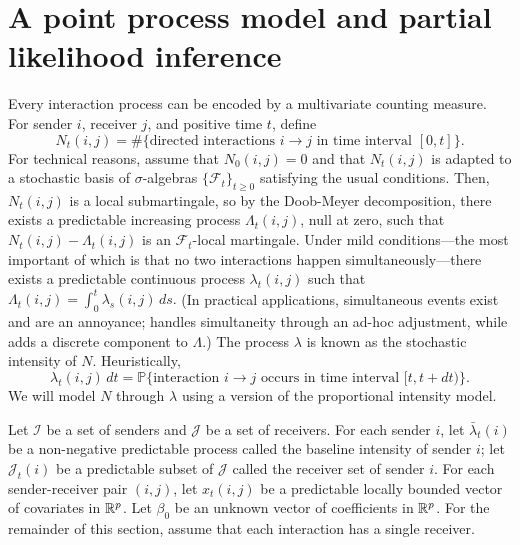 \documentclass[final]{statsoc}
\begin{document}
\section{A point process model and partial likelihood inference}
\label{S:point-process-model}

Every interaction process can be encoded by a multivariate counting measure.
For sender $i$, receiver $j$, and positive time $t$, define
\[
    N_t(i,j)
        =
        \#\{
            \text{directed interactions $i\rightarrow j$ in time interval
            $[0,t]$}
        \}.
\]
For technical reasons, assume that $N_0(i,j) = 0$ and that $N_t(i,j)$ is
adapted to a stochastic basis of $\sigma$-algebras
$\{ \mathcal{F}_t \}_{t \geq 0}$ satisfying the usual conditions.  Then,
$N_t(i,j)$ is a local submartingale, so by the Doob-Meyer decomposition,
there exists a predictable increasing process $\Lambda_t(i,j)$, null at
zero, such that $N_t(i,j) - \Lambda_t(i,j)$ is an $\mathcal{F}_t$-local
martingale.  Under mild conditions---the most important of which is that
no two interactions happen simultaneously---there exists a predictable
continuous process $\lambda_t(i,j)$ such that
\(
    \Lambda_t(i,j) = \int_0^t \lambda_s(i,j) \, ds.
\)
(In practical applications, simultaneous events exist and are an annoyance;
\citet{efron1977efficiency} handles simultaneity through an ad-hoc
adjustment, while \citet{brostrom2002cox} adds a discrete component
to $\Lambda$.)  The process $\lambda$ is known as the stochastic intensity
of $N$.  Heuristically,
\[
    \lambda_t(i,j) \, dt
        =
        \mathbb{P}\{
            \text{interaction $i\rightarrow j$ occurs in time interval $[t,t+dt)$}
        \}.
\]
We will model $N$ through $\lambda$ using a version of the \citet{cox1972regression}
proportional intensity model.

Let $\mathcal{I}$ be a set of senders and $\mathcal{J}$ be a set of receivers.
For each sender $i$, let $\bar \lambda_t(i)$ be a non-negative predictable
process called the baseline intensity of sender $i$; let $\mathcal{J}_t(i)$ be
a predictable subset of $\mathcal{J}$ called the receiver set of sender $i$.
For each sender-receiver pair $(i,j)$, let $x_t(i,j)$ be a predictable
locally bounded vector of covariates in $\mathbb{R}^p$.  Let $\beta_0$
be an unknown vector of coefficients in  $\mathbb{R}^p$.  For the remainder of
this section, assume that each interaction has a single receiver.
\end{document}
